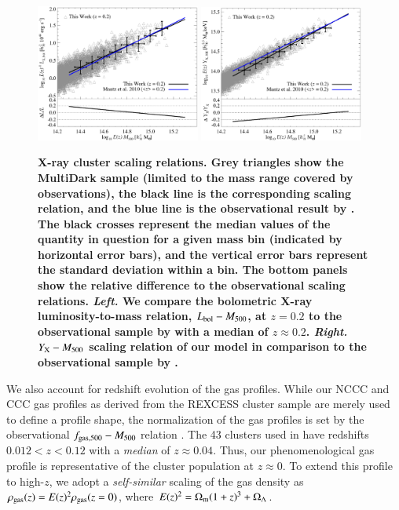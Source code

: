\documentclass[useAMS,usenatbib]{mn2e}
\begin{document}
\begin{figure} 
\centering
\includegraphics[width=0.48\textwidth]{figures/lx_m.eps}
\includegraphics[width=0.48\textwidth]{figures/yx_m.eps}
\caption{{\bf X-ray cluster scaling relations. Grey triangles show the MultiDark
  sample (limited to the mass range covered by observations), the black line is
  the corresponding scaling relation, and the blue line is the
  observational result by \protect\cite{2010MNRAS.406.1773M}. 
  The black crosses represent the median values of the
  quantity in question for a given mass bin (indicated by horizontal error
  bars), and the vertical error bars represent the standard deviation within a
  bin. The bottom panels show the relative difference to the observational
    scaling relations. \emph{Left.} We compare the bolometric X-ray luminosity-to-mass
  relation, $L_{{\mathrm{bol}}}-M_{500}$, at $z=0.2$ to the observational sample by
  \protect\cite{2010MNRAS.406.1773M} with a median of $z \approx 0.2$. 
  \emph{Right.} $Y_{{\mathrm{X}}}-M_{500}$ scaling relation of our model in comparison to the
  observational sample by \protect\cite{2010MNRAS.406.1773M}.}} 
\label{fig:X_LM}
\end{figure}

We also account for redshift evolution of the gas profiles. While our NCCC and
CCC gas profiles as derived from the REXCESS cluster sample are merely used to
define a profile shape, the normalization of the gas profiles is set by the
observational $f_{{\mathrm{gas}},500}-M_{500}$ relation \citep{2009ApJ...693.1142S}.
The 43 clusters used in \cite{2009ApJ...693.1142S} have redshifts $0.012 < z <
0.12$ with a \emph{median} of $z \approx 0.04$. Thus, our phenomenological gas
profile is representative of the cluster population at $z\approx0$. To extend
this profile to high-$z$, we adopt a \emph{self-similar} scaling of the gas
density as $\rho_{{\mathrm{gas}}}(z) = E(z)^{2} \rho_{{\mathrm{gas}}}(z=0)$, where
$E(z)^{2} = \Omega_{{\mathrm{m}}} (1+z)^{3} + \Omega_{{\Lambda}}$.
\end{document}
